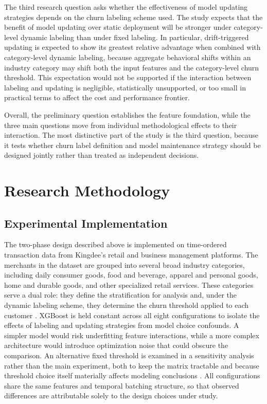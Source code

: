 The third research question asks whether the effectiveness of model updating strategies depends on the churn labeling scheme used. The study expects that the benefit of model updating over static deployment will be stronger under category-level dynamic labeling than under fixed labeling. In particular, drift-triggered updating is expected to show its greatest relative advantage when combined with category-level dynamic labeling, because aggregate behavioral shifts within an industry category may shift both the input features and the category-level churn threshold. This expectation would not be supported if the interaction between labeling and updating is negligible, statistically unsupported, or too small in practical terms to affect the cost and performance frontier.

Overall, the preliminary question establishes the feature foundation, while the three main questions move from individual methodological effects to their interaction. The most distinctive part of the study is the third question, because it tests whether churn label definition and model maintenance strategy should be designed jointly rather than treated as independent decisions.

\section{Research Methodology}

\subsection{Experimental Implementation}

The two-phase design described above is implemented on time-ordered transaction data from Kingdee's retail and business management platforms. The merchants in the dataset are grouped into several broad industry categories, including daily consumer goods, food and beverage, apparel and personal goods, home and durable goods, and other specialized retail services. These categories serve a dual role: they define the stratification for analysis and, under the dynamic labeling scheme, they determine the churn threshold applied to each customer \citep{singh2023retailchurn}. XGBoost is held constant across all eight configurations to isolate the effects of labeling and updating strategies from model choice confounds. A simpler model would risk underfitting feature interactions, while a more complex architecture would introduce optimization noise that could obscure the comparison. An alternative fixed threshold is examined in a sensitivity analysis rather than the main experiment, both to keep the matrix tractable and because threshold choice itself materially affects modeling conclusions \cite{mirkovic2022}. All configurations share the same features and temporal batching structure, so that observed differences are attributable solely to the design choices under study.


